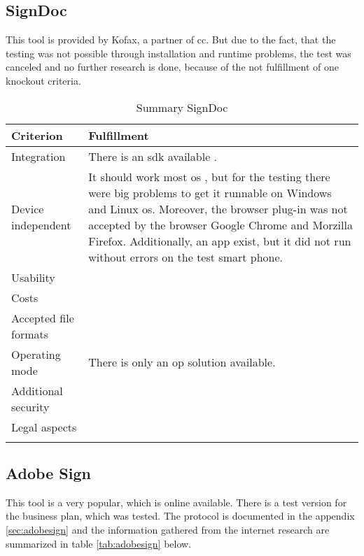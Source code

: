\subsection{SignDoc}
This tool is provided by Kofax, a partner of \gls{cc}. But due to the fact, that the testing was not possible through installation and runtime problems, the test was canceled and no further research is done, because of the not fulfillment of one knockout criteria. 

	\begin{longtable}{|p{4cm}|p{10cm}|} \hline
		\rowcolor{Gray}Criterion & Fulfillment \\ \hline
		Integration & There is an \gls{sdk} available \parencite{kofax2018sdk}. \\ \hline
		Device independent & It should work most \gls{os} \parencite{kofax2018sdk}, but for the testing there were big problems to get it runnable on Windows and Linux \gls{os}. Moreover, the browser plug-in was not accepted by the browser Google Chrome and Morzilla Firefox. Additionally, an \gls{app} exist, but it did not run without errors on the test smart phone. \\ \hline
		Usability & \\ \hline
		Costs & \\ \hline
		Accepted file formats & \\ \hline
		Operating mode & There is only an \gls{op} solution available.\\ \hline
		Additional security & \\ \hline
		Legal aspects & \\ \hline
	\caption{Summary SignDoc}
	\label{tab:signdoc}
	\end{longtable}

\subsection{Adobe Sign}
This tool is a very popular, which is online available. There is a test version for the business plan, which was tested. The protocol is documented in the appendix \ref{sec:adobesign} and the information gathered from the internet research are summarized in table \ref{tab:adobesign} below. 
	

